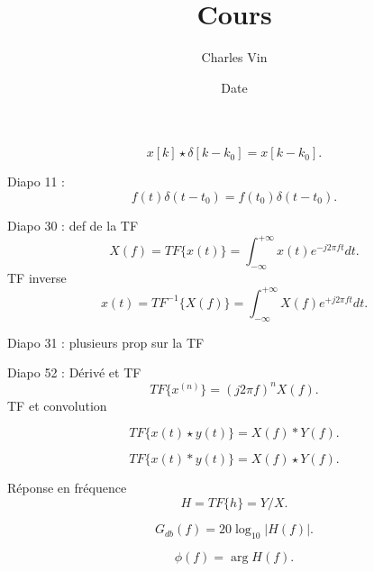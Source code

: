 \documentclass{article}
\title{Cours}
\author{Charles Vin}
\date{Date}
\theoremstyle{plain}%
\theoremstyle{definition}
\theoremstyle{remark}
\begin{document}
\maketitle


\[
    x[k] \star \delta [k - k_0] = x[k-k_0]
.\]

Diapo 11 : 
\[
    f(t) \delta (t - t_0) = f(t_0) \delta (t - t_0)
.\]

Diapo 30 : def de la TF 
\[
    X(f) = TF\{x(t)\} = \int_{-\infty }^{+\infty }x(t)e^{-j2 \pi ft}dt
.\]
TF inverse 
\[
    x(t) = TF^{-1} \{X(f)\} = \int_{-\infty }^{+\infty } X(f) e^{+j2 \pi ft}dt
.\]


Diapo 31 : plusieurs prop sur la TF

Diapo 52 : Dérivé et TF
\[
    TF\{x^{(n)}\} = (j2 \pi f)^n X(f)
.\]
TF et convolution 

\[
    TF\{x(t) \star y(t)\} = X(f) * Y(f)
.\]

\[
    TF\{x(t) * y(t)\} = X(f) \star Y(f)
.\]

Réponse en fréquence 
\[
    H = TF\{h\} = Y/X
.\]


\[
    G_{db}(f) = 20 \log_{10} \left| H(f) \right| 
.\]

\[
    \phi (f) = \arg H(f)
.\]
\end{document}
